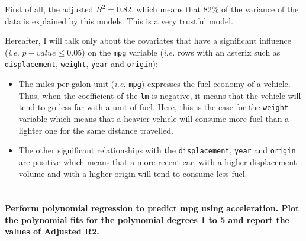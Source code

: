 \documentclass[
  12pt,
  oneside]{report}
\begin{document}
First of all, the adjusted \(R^2 = 0.82\), which means that 82\% of the variance of the data is explained by this models. This is a very trustful model.

Hereafter, I will talk only about the covariates that have a significant influence (\emph{i.e.} \(p-value \leq 0.05\)) on the \texttt{mpg} variable (\emph{i.e.} rows with an asterix such as \texttt{displacement}, \texttt{weight}, \texttt{year} and \texttt{origin}):

\begin{itemize}
\item
  The miles per galon unit (\emph{i.e.} \texttt{mpg}) expresses the fuel economy of a vehicle. Thus, when the coefficient of the \texttt{lm} is negative, it means that the vehicle will tend to go less far with a unit of fuel. Here, this is the case for the \texttt{weight} variable which means that a heavier vehicle will consume more fuel than a lighter one for the same distance travelled.
\item
  The other significant relationships with the \texttt{displacement}, \texttt{year} and \texttt{origin} are positive which means that a more recent car, with a higher displacement volume and with a higher origin will tend to consume less fuel.
\end{itemize}

\newpage

\hypertarget{section-1}{%
\section{}\label{section-1}}

\textbf{Perform polynomial regression to predict mpg using acceleration. Plot the polynomial fits
for the polynomial degrees 1 to 5 and report the values of Adjusted R2.}
\end{document}
